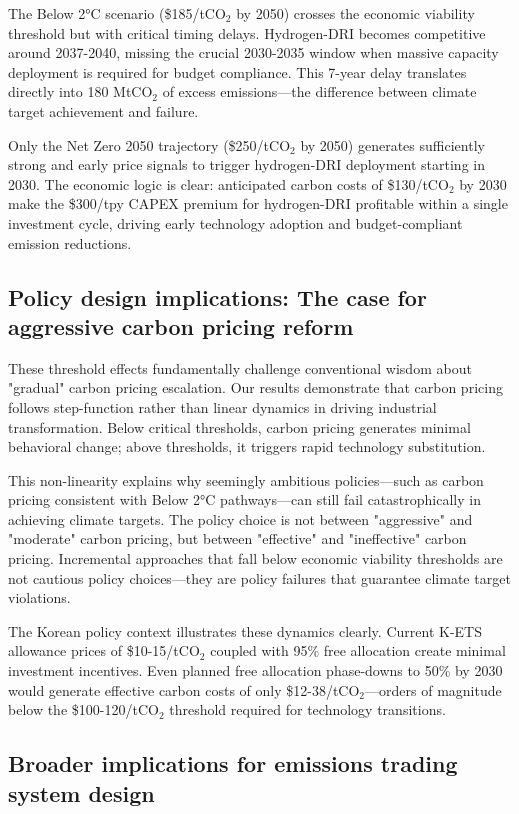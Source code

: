 \documentclass[preprint,1p,authoryear]{elsarticle}
\begin{document}
The Below 2°C scenario (\$185/tCO$_2$ by 2050) crosses the economic viability threshold but with critical timing delays. Hydrogen-DRI becomes competitive around 2037-2040, missing the crucial 2030-2035 window when massive capacity deployment is required for budget compliance. This 7-year delay translates directly into 180 MtCO$_2$ of excess emissions—the difference between climate target achievement and failure.

Only the Net Zero 2050 trajectory (\$250/tCO$_2$ by 2050) generates sufficiently strong and early price signals to trigger hydrogen-DRI deployment starting in 2030. The economic logic is clear: anticipated carbon costs of \$130/tCO$_2$ by 2030 make the \$300/tpy CAPEX premium for hydrogen-DRI profitable within a single investment cycle, driving early technology adoption and budget-compliant emission reductions.

\subsection{Policy design implications: The case for aggressive carbon pricing reform}

These threshold effects fundamentally challenge conventional wisdom about "gradual" carbon pricing escalation. Our results demonstrate that carbon pricing follows step-function rather than linear dynamics in driving industrial transformation. Below critical thresholds, carbon pricing generates minimal behavioral change; above thresholds, it triggers rapid technology substitution.

This non-linearity explains why seemingly ambitious policies—such as carbon pricing consistent with Below 2°C pathways—can still fail catastrophically in achieving climate targets. The policy choice is not between "aggressive" and "moderate" carbon pricing, but between "effective" and "ineffective" carbon pricing. Incremental approaches that fall below economic viability thresholds are not cautious policy choices—they are policy failures that guarantee climate target violations.

The Korean policy context illustrates these dynamics clearly. Current K-ETS allowance prices of \$10-15/tCO$_2$ coupled with 95\% free allocation create minimal investment incentives. Even planned free allocation phase-downs to 50\% by 2030 would generate effective carbon costs of only \$12-38/tCO$_2$—orders of magnitude below the \$100-120/tCO$_2$ threshold required for technology transitions.

\subsection{Broader implications for emissions trading system design}
\end{document}
